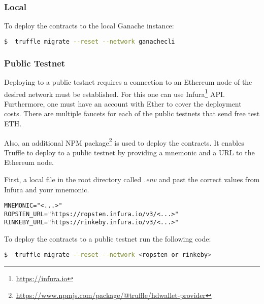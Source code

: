 \subsubsection{Local}

\noindent To deploy the contracts to the local Ganache instance:
\begin{lstlisting}[language=bash]
  $  truffle migrate --reset --network ganachecli
\end{lstlisting}

\subsubsection{Public Testnet}

Deploying to a public testnet requires a connection to an Ethereum node of the desired network must be established. For this one can use Infura\footnote{\href{https://infura.io}{https://infura.io}} API. Furthermore, one must have an account with Ether to cover the deployment costs. There are multiple faucets for each of the public testnets that send free test ETH. 

Also, an additional NPM package\footnote{\href{https://www.npmjs.com/package/@truffle/hdwallet-provider}{https://www.npmjs.com/package/@truffle/hdwallet-provider}} is used to deploy the contracts. It enables Truffle to deploy to a public testnet by providing a mnemonic and a URL to the Ethereum node.

First, a local file in the root directory called \textit{.env} and past the correct values from Infura and your mnemonic.

\begin{lstlisting}
MNEMONIC="<...>"
ROPSTEN_URL="https://ropsten.infura.io/v3/<...>"
RINKEBY_URL="https://rinkeby.infura.io/v3/<...>"
\end{lstlisting}

\noindent To deploy the contracts to a public testnet run the following code:
\begin{lstlisting}[language=bash]
  $  truffle migrate --reset --network <ropsten or rinkeby>
\end{lstlisting}
